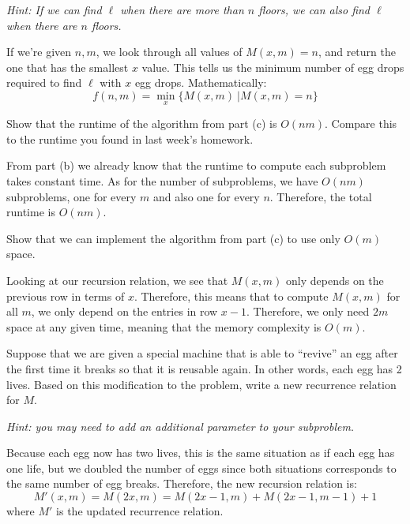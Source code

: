 \documentclass[11pt]{article}
\begin{document}
\begin{subparts}
\emph{Hint: If we can find $\ell$ when there are more than $n$ floors, we can also find $\ell$ when there are $n$ floors.}

	\begin{solution}
		If we're given \(n, m\), we look through all values of \(M(x, m) = n\), and return the one that 
		has the smallest \(x\) value. This tells us the minimum number of egg drops required to find \(\ell\) 
		with \(x\) egg drops. Mathematically:
		\[
			f(n, m) = \min_{x} \{M(x, m)\ | M(x, m) = n\} 
		\] 
	\end{solution}


\item  Show that the runtime of the algorithm from part (c) is $O(nm)$. Compare this to the runtime you found in last week's homework.

	\begin{solution}
		From part (b) we already know that the runtime to compute each subproblem takes constant time. As 
		for the number of subproblems, we have $O(nm)$ subproblems, one for every \(m\) and also one for 
		every \(n\). Therefore, the total runtime is \(O(nm)\).
	\end{solution}

\item Show that we can implement the algorithm from part (c) to use only $O(m)$ space.

	\begin{solution}
		Looking at our recursion relation, we see that \(M(x, m)\) only depends on the previous row in terms of 
		\(x\). Therefore, this means that to compute \(M(x, m)\) for all \(m\), we only depend on the entries 
		in row \(x-1\). Therefore, we only need \(2m\) space at any given time, meaning that the memory 
		complexity is \(O(m)\).
	\end{solution}

\item Suppose that we are given a special machine that is able to ``revive'' an egg after the first time it breaks so that it is reusable again. In other words, each egg has 2 lives. Based on this modification to the problem, write a new recurrence relation for $M$.

\emph{Hint: you may need to add an additional parameter to your subproblem.}

\begin{solution}
	Because each egg now has two lives, this is the same situation as if each egg has one life, but we doubled 
	the number of eggs since both situations corresponds to the same number of egg breaks. Therefore, the new 
	recursion relation is:
	\[
	M'(x, m) = M(2x, m) = M(2x-1, m) + M(2x-1, m-1) + 1
	\] 
	where \(M'\) is the updated recurrence relation.
\end{solution}
\end{subparts}
\end{document}
